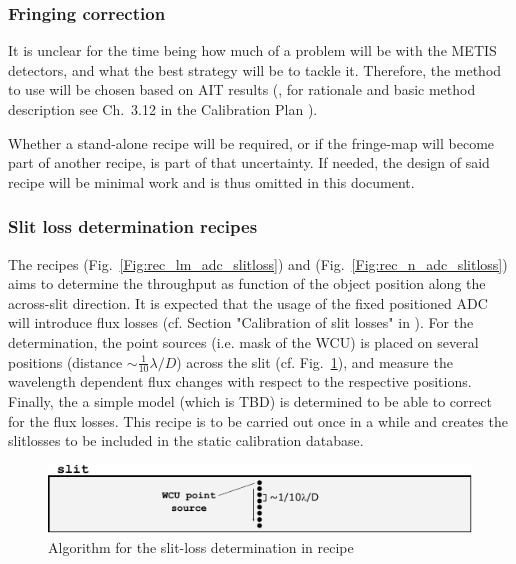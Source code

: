 \subsubsection{Fringing correction}
\label{rec:metis_fringing_correction}

It is unclear for the time being how much of a problem will be with the METIS
detectors, and what the best strategy will be to tackle it. Therefore, the
method to use will be chosen based on AIT results (, for rationale and basic method description see Ch.~3.12 in the Calibration Plan \cite{METIS-calibration_plan}).

Whether a stand-alone recipe will be required, or if the fringe-map will become
part of another recipe, is part of that uncertainty. If needed, the design of
said recipe will be minimal work and is thus omitted in this document.

\subsubsection{Slit loss determination recipes }\label{sssec:adc_slitlosses}
The recipes \hyperref[rec:metis_lm_adc_slitloss]{} (Fig.~\ref{Fig:rec_lm_adc_slitloss}) and \hyperref[rec:metis_n_adc_slitloss]{} (Fig.~\ref{Fig:rec_n_adc_slitloss}) aims to determine the throughput as function of the object position along the across-slit direction. It is expected that the usage of the fixed positioned \ac{ADC} will introduce flux losses (cf. Section "Calibration of slit losses" in  \cite{METIS-calibration_plan}). For the determination, the point sources (i.e. mask of the \ac{WCU}) is placed on several positions (distance $\sim\frac{1}{10}\lambda/D$) across the slit (cf. Fig.~\ref{Fig:slitloss}), and measure the wavelength dependent flux changes with respect to the respective positions. Finally, the a simple model (which is TBD) is determined to be able to correct for the flux losses. This recipe is to be carried out once in a while and creates the slitlosses to be included in the static calibration database.
\begin{figure}[ht]
  \centering
  \includegraphics[width=0.5\textheight]{figures/slitloss_det.pdf}
  \caption[slitloss determination]{Algorithm for the slit-loss determination in recipe  }
  \label{Fig:slitloss}
\end{figure}

